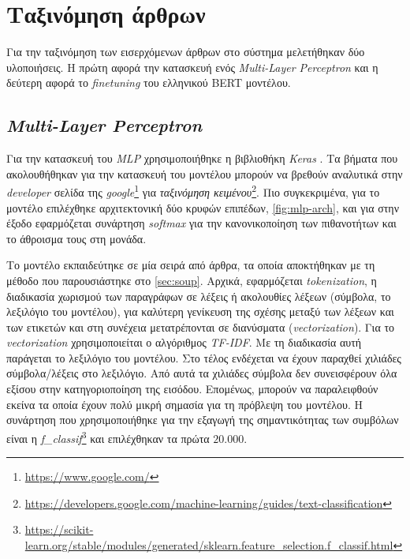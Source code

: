 \section{Ταξινόμηση άρθρων}
\label{sec:classification}
Για την ταξινόμηση των εισερχόμενων άρθρων στο σύστημα μελετήθηκαν δύο υλοποιήσεις. Η πρώτη αφορά την κατασκευή ενός \emph{Multi-Layer Perceptron} και η δεύτερη αφορά το \emph{finetuning} του ελληνικού BERT \cite{greek-bert} μοντέλου.

\subsection{\emph{Multi-Layer Perceptron}}
Για την κατασκευή του \emph{MLP} χρησιμοποιήθηκε η βιβλιοθήκη \emph{Keras} \cite{keras}. Τα βήματα που ακολουθήθηκαν για την κατασκευή του μοντέλου μπορούν να βρεθούν αναλυτικά στην \emph{developer} σελίδα της \emph{google}\footnote{\url{https://www.google.com/}} για \emph{ταξινόμηση κειμένου}\footnote{\url{https://developers.google.com/machine-learning/guides/text-classification}}. Πιο συγκεκριμένα, για το μοντέλο επιλέχθηκε αρχιτεκτονική δύο κρυφών επιπέδων, \autoref{fig:mlp-arch}, και για στην έξοδο εφαρμόζεται συνάρτηση \emph{softmax} για την κανονικοποίηση των πιθανοτήτων και το άθροισμα τους στη μονάδα.

Το μοντέλο εκπαιδεύτηκε σε μία σειρά από άρθρα, τα οποία αποκτήθηκαν με τη μέθοδο που παρουσιάστηκε στο \autoref{sec:soup}. Αρχικά, εφαρμόζεται \emph{tokenization}, η διαδικασία  χωρισμού των παραγράφων σε λέξεις ή ακολουθίες λέξεων (σύμβολα, το λεξιλόγιο του μοντέλου), για καλύτερη γενίκευση της σχέσης μεταξύ των λέξεων και των ετικετών και στη συνέχεια μετατρέπονται σε διανύσματα (\emph{vectorization}). Για το \emph{vectorization} χρησιμοποιείται ο αλγόριθμος \emph{TF-IDF}. Με τη διαδικασία αυτή παράγεται το λεξιλόγιο του μοντέλου. Στο τέλος ενδέχεται να έχουν παραχθεί χιλιάδες σύμβολα/λέξεις στο λεξιλόγιο. Από αυτά τα χιλιάδες σύμβολα δεν συνεισφέρουν όλα εξίσου στην κατηγοριοποίηση της εισόδου. Επομένως, μπορούν να παραλειφθούν εκείνα τα οποία έχουν πολύ μικρή σημασία για τη πρόβλεψη του μοντέλου. Η συνάρτηση που χρησιμοποιήθηκε για την εξαγωγή της σημαντικότητας των συμβόλων είναι η \emph{f\_classif}\footnote{\url{https://scikit-learn.org/stable/modules/generated/sklearn.feature_selection.f_classif.html}} και επιλέχθηκαν τα πρώτα $20.000$. 

